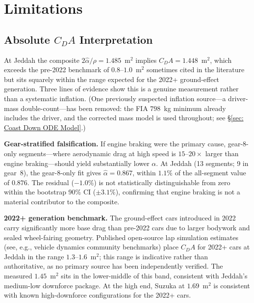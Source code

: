 \section{Limitations} 
\label{sec: Limitations}

\subsection[Absolute CDA Interpretation]{Absolute $C_DA$ Interpretation}
\label{sec: Absolute CDA Interpretation}

At Jeddah the composite $2\hat\alpha/\rho = 1.485$~m$^2$ implies $C_DA = 1.448$~m$^2$, which exceeds the pre-2022 benchmark of $0.8$--$1.0$~m$^2$ sometimes cited in the literature but sits squarely within the range expected for the 2022+ ground-effect generation. Three lines of evidence show this is a genuine measurement rather than a systematic inflation. (One previously suspected inflation source---a driver-mass double-count---has been removed: the FIA $798$~kg minimum already includes the driver, and the corrected mass model is used throughout; see \S\ref{sec: Coast Down ODE Model}.)

\textbf{Gear-stratified falsification.} If engine braking were the primary cause, gear-8-only segments---where aerodynamic drag at high speed is $15$--$20\times$ larger than engine braking---should yield substantially lower $\alpha$. At Jeddah (13 segments; 9 in gear~8), the gear-8-only fit gives $\hat{\alpha} = 0.867$, within $1.1\%$ of the all-segment value of $0.876$. The residual ($-1.0\%$) is not statistically distinguishable from zero within the bootstrap 90\% CI ($\pm 3.1\%$), confirming that engine braking is not a material contributor to the composite.

\textbf{2022+ generation benchmark.} The ground-effect cars introduced in 2022 carry significantly more base drag than pre-2022 cars due to larger bodywork and sealed wheel-fairing geometry. Published open-source lap simulation estimates (see, e.g., vehicle dynamics community benchmarks) place $C_DA$ for 2022+ cars at Jeddah in the range $1.3$--$1.6$~m$^2$; this range is indicative rather than authoritative, as no primary source has been independently verified. The measured $1.45$~m$^2$ sits in the lower-middle of this band, consistent with Jeddah's medium-low downforce package. At the high end, Suzuka at $1.69$~m$^2$ is consistent with known high-downforce configurations for the 2022+ cars.

